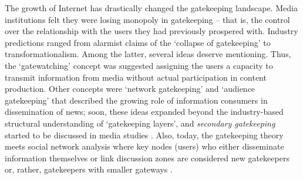 The growth of Internet has drastically changed the gatekeeping landscape. Media institutions felt they were losing monopoly in gatekeeping -- that is, the control over the relationship with the users they had previously prospered with. Industry predictions ranged from alarmist claims of the ‘collapse of gatekeeping’ \cite{WilliamsDeliCarpini} to transformationalism. Among the latter, several ideas deserve mentioning. Thus, the ‘gatewatching’ concept was suggested \cite{Bruns} assigning the users a capacity to transmit information from media without actual participation in content production. Other concepts were ‘network gatekeeping’ \cite{BarzilaiNahon} and ‘audience gatekeeping’ \cite{ShoemakerVos} that described the growing role of information consumers in dissemination of news; soon, these ideas expanded beyond the industry-based structural understanding of ‘gatekeeping layers’, and \textit{secondary gatekeeping} started to be discussed in media studies \cite[p.~6]{ShoemakerVos} \cite{RobertsBantimaroudis,White1950}. Also, today, the gatekeeping theory meets social network analysis where key nodes (users) who either disseminate information themselves or link discussion zones are considered new gatekeepers \cite{JurgensJungherrSchoen} or, rather, gatekeepers with smaller gateways \cite{BastosRaimundoTravitzki}.

